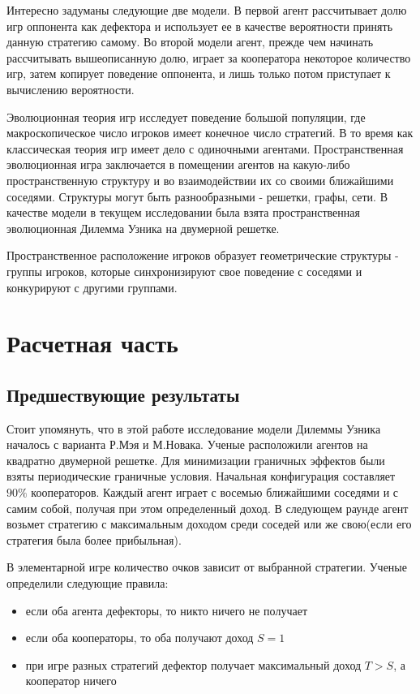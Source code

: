\documentclass[12pt,a4paper]{article}
\begin{document}
	\par Интересно задуманы следующие две модели. В первой агент рассчитывает долю игр оппонента как дефектора и использует ее в качестве вероятности принять данную стратегию самому. Во второй модели агент, прежде чем начинать рассчитывать вышеописанную долю, играет за кооператора некоторое количество игр, затем копирует поведение оппонента, и лишь только потом приступает к вычислению вероятности.
	
	\par Эволюционная теория игр исследует поведение большой популяции, где макроскопическое
	число игроков имеет конечное число стратегий. В то время как классическая теория игр имеет дело с одиночными агентами. Пространственная эволюционная игра заключается в помещении агентов на какую-либо пространственную структуру и во взаимодействии их со своими ближайшими соседями. Структуры могут быть разнообразными - решетки, графы, сети. В качестве модели в текущем исследовании была взята пространственная эволюционная Дилемма Узника на двумерной решетке.
	
	\par Пространственное расположение игроков образует геометрические структуры - группы игроков, которые синхронизируют свое поведение с соседями и конкурируют с другими группами.
	 
	
	\section{Расчетная часть}
	 
	
	\subsection{Предшествующие результаты}
	
	\par Стоит упомянуть, что в этой работе исследование модели Дилеммы Узника началось с варианта Р.Мэя и М.Новака. Ученые расположили агентов на квадратно двумерной решетке. Для минимизации граничных эффектов были взяты периодические граничные условия. Начальная конфигурация составляет $90\%$ кооператоров. Каждый агент играет с восемью ближайшими соседями и с самим собой, получая при этом определенный доход. В следующем раунде агент возьмет стратегию с максимальным доходом среди соседей или же свою(если его стратегия была более прибыльная).
	
	\par В элементарной игре количество очков зависит от выбранной стратегии. Ученые определили следующие правила:
	\begin{itemize}
		\item если оба агента дефекторы, то никто ничего не получает
		\item если оба кооператоры, то оба получают доход $S=1$
		\item при игре разных стратегий дефектор получает максимальный доход $T>S$, а кооператор ничего
	\end{itemize}
	
\end{document}
